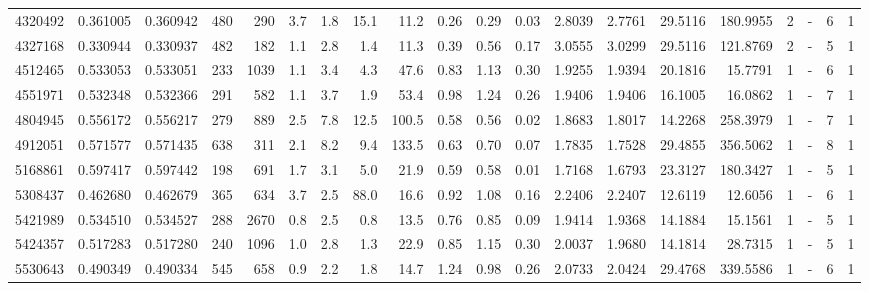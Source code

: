 \begin{tabular}{rrrrrrrrrrrrrrrrrlrl}
   4320492 & 0.361005 & 0.360942 &  480 &  290 &      3.7 &      1.8 &    15.1 &    11.2 &   0.26 &   0.29 &       0.03 &  2.8039 &  2.7761 &   29.5116 &  180.9955 &       2 &             - &        6 &         1 \\
   4327168 & 0.330944 & 0.330937 &  482 &  182 &      1.1 &      2.8 &     1.4 &    11.3 &   0.39 &   0.56 &       0.17 &  3.0555 &  3.0299 &   29.5116 &  121.8769 &       2 &             - &        5 &         1 \\
   4512465 & 0.533053 & 0.533051 &  233 & 1039 &      1.1 &      3.4 &     4.3 &    47.6 &   0.83 &   1.13 &       0.30 &  1.9255 &  1.9394 &   20.1816 &   15.7791 &       1 &             - &        6 &         1 \\
   4551971 & 0.532348 & 0.532366 &  291 &  582 &      1.1 &      3.7 &     1.9 &    53.4 &   0.98 &   1.24 &       0.26 &  1.9406 &  1.9406 &   16.1005 &   16.0862 &       1 &             - &        7 &         1 \\
   4804945 & 0.556172 & 0.556217 &  279 &  889 &      2.5 &      7.8 &    12.5 &   100.5 &   0.58 &   0.56 &       0.02 &  1.8683 &  1.8017 &   14.2268 &  258.3979 &       1 &             - &        7 &         1 \\
   4912051 & 0.571577 & 0.571435 &  638 &  311 &      2.1 &      8.2 &     9.4 &   133.5 &   0.63 &   0.70 &       0.07 &  1.7835 &  1.7528 &   29.4855 &  356.5062 &       1 &             - &        8 &         1 \\
   5168861 & 0.597417 & 0.597442 &  198 &  691 &      1.7 &      3.1 &     5.0 &    21.9 &   0.59 &   0.58 &       0.01 &  1.7168 &  1.6793 &   23.3127 &  180.3427 &       1 &             - &        5 &         1 \\
   5308437 & 0.462680 & 0.462679 &  365 &  634 &      3.7 &      2.5 &    88.0 &    16.6 &   0.92 &   1.08 &       0.16 &  2.2406 &  2.2407 &   12.6119 &   12.6056 &       1 &             - &        6 &         1 \\
   5421989 & 0.534510 & 0.534527 &  288 & 2670 &      0.8 &      2.5 &     0.8 &    13.5 &   0.76 &   0.85 &       0.09 &  1.9414 &  1.9368 &   14.1884 &   15.1561 &       1 &             - &        5 &         1 \\
   5424357 & 0.517283 & 0.517280 &  240 & 1096 &      1.0 &      2.8 &     1.3 &    22.9 &   0.85 &   1.15 &       0.30 &  2.0037 &  1.9680 &   14.1814 &   28.7315 &       1 &             - &        5 &         1 \\
   5530643 & 0.490349 & 0.490334 &  545 &  658 &      0.9 &      2.2 &     1.8 &    14.7 &   1.24 &   0.98 &       0.26 &  2.0733 &  2.0424 &   29.4768 &  339.5586 &       1 &             - &        6 &         1 \\

\end{tabular}
